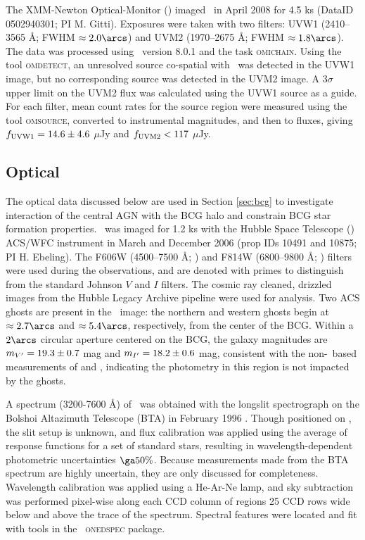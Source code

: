 \documentclass[11pt, preprint]{aastex}
\begin{document}
The XMM-Newton Optical-Monitor (\xom) imaged \rbs\ in April 2008 for
4.5 ks (DataID 0502940301; PI M. Gitti). Exposures were taken with two
filters: UVW1 (2410--3565 \AA; FWHM $\approx 2.0\arcs$) and UVM2
(1970--2675 \AA; FWHM $\approx 1.8\arcs$). The data was processed
using \sas\ version 8.0.1 and the task {\textsc{omichain}}. Using the
tool {\textsc{omdetect}}, an unresolved source co-spatial with
\rbs\ was detected in the UVW1 image, but no corresponding source was
detected in the UVM2 image. A $3\sigma$ upper limit on the UVM2 flux
was calculated using the UVW1 source as a guide. For each filter, mean
count rates for the source region were measured using the tool
{\textsc{omsource}}, converted to instrumental magnitudes, and then to
fluxes, giving $f_{\rm{UVW1}} = 14.6 \pm 4.6$ $\mu$Jy and
$f_{\rm{UVM2}} < 117$ $\mu$Jy.

\subsection{Optical}

The optical data discussed below are used in Section \ref{sec:bcg} to
investigate interaction of the central AGN with the BCG halo and
constrain BCG star formation properties. \rbs\ was imaged for 1.2 ks
with the Hubble Space Telescope (\hst) ACS/WFC instrument in March and
December 2006 (prop IDs 10491 and 10875; PI H. Ebeling). The F606W
(4500--7500 \AA; \myv) and F814W (6800--9800 \AA; \myi) filters were
used during the observations, and are denoted with primes to
distinguish from the standard Johnson $V$ and $I$ filters. The cosmic
ray cleaned, drizzled images from the Hubble Legacy Archive pipeline
were used for analysis. Two ACS ghosts \citep{acsghost} are present in
the \myi\ image: the northern and western ghosts begin at $\approx
2.7\arcs$ and $\approx 5.4\arcs$, respectively, from the center of the
BCG. Within a $2\arcs$ circular aperture centered on the BCG, the
galaxy magnitudes are $m_{V^{\prime}} = 19.3 \pm 0.7$ mag and $m_{I^{\prime}} =
18.2 \pm 0.6$ mag, consistent with the non-\hst\ based measurements of
\citet{rbs1} and \citet{rbs2}, indicating the photometry in this
region is not impacted by the ghosts.

A spectrum (3200-7600 \AA) of \rbs\ was obtained with the longslit
spectrograph on the Bolshoi Altazimuth Telescope (BTA) in February
1996 \citep{rbs1, rbs2}. Though positioned on \rbs, the slit setup is
unknown, and flux calibration was applied using the average of
response functions for a set of standard stars, resulting in
wavelength-dependent photometric uncertainties $\ga 50\%$. Because
measurements made from the BTA spectrum are highly uncertain, they are
only discussed for completeness. Wavelength calibration was applied
using a He-Ar-Ne lamp, and sky subtraction was performed pixel-wise
along each CCD column of regions 25 CCD rows wide below and above the
trace of the spectrum. Spectral features were located and fit with
tools in the \iraf\ {\textsc{onedspec}} package.
\end{document}
